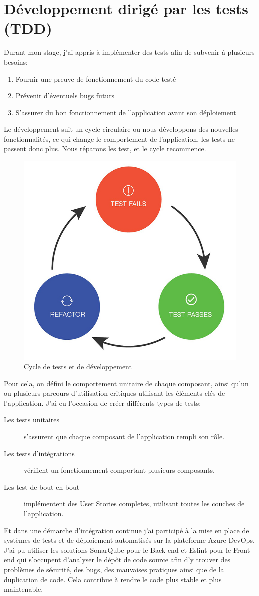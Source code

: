 \documentclass[12pt, a4paper]{report}
\begin{document}
\section{Développement dirigé par les tests (TDD)}
Durant mon stage, j'ai appris à implémenter des tests afin de subvenir à plusieurs besoins\@:
\begin{enumerate}
    \item Fournir une preuve de fonctionnement du code testé
    \item Prévenir d'éventuels bugs futurs
    \item S'assurer du bon fonctionnement de l'application avant son déploiement
\end{enumerate}
Le développement suit un cycle circulaire ou nous développons des nouvelles fonctionnalités, ce qui change le comportement de l'application, les tests ne passent donc plus. Nous réparons les test, et le cycle recommence.
\begin{figure}[H]
    \begin{center}
        \includegraphics[width=0.5\linewidth]{TDD.jpg}
    \end{center}
    \caption{Cycle de tests et de développement}
\end{figure}
Pour cela, on défini le comportement unitaire de chaque composant, ainsi qu'un ou plusieurs parcours d'utilisation critiques utilisant les éléments clés de l'application.\newline
J'ai eu l'occasion de créer différents types de tests\@:
\begin{description}
    \item [Les tests unitaires] s'assurent que chaque composant de l'application rempli son rôle.
    \item [Les tests d'intégrations] vérifient un fonctionnement comportant plusieurs composants.
    \item [Les test de bout en bout] implémentent des User Stories completes, utilisant toutes les couches de l'application.
\end{description}
Et dans une démarche d'intégration continue j'ai participé à la mise en place de systèmes de tests et de déploiement automatisés sur la plateforme Azure DevOps.\newline
J'ai pu utiliser les solutions SonarQube pour le Back-end et Eslint pour le Front-end qui s'occupent d'analyser le dépôt de code source afin d'y trouver des problèmes de sécurité, des bugs, des mauvaises pratiques ainsi que de la duplication de code.\newline
Cela contribue à rendre le code plus stable et plus maintenable.\newline
\end{document}
